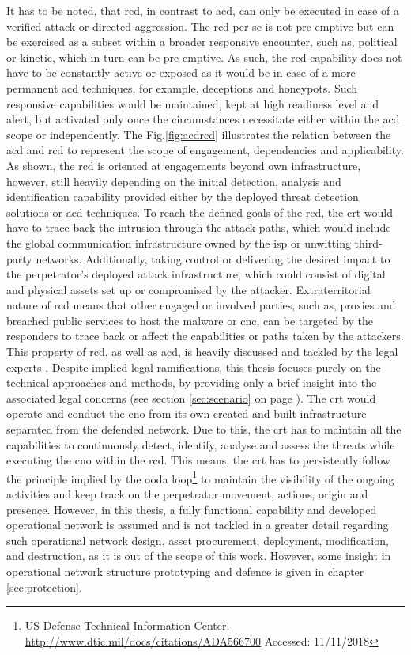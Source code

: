 It has to be noted, that \gls{rcd}, in contrast to \gls{acd}, can only be executed in case of a verified attack or directed aggression. The \gls{rcd} per se is not pre-emptive but can be exercised as a subset within a broader responsive encounter, such as, political or kinetic, which in turn can be pre-emptive.
As such, the \gls{rcd} capability does not have to be constantly active or exposed as it would be in case of a more permanent \gls{acd} techniques, for example, deceptions and honeypots. Such responsive capabilities would be maintained, kept at high readiness level and alert, but activated only once the circumstances necessitate either within the \gls{acd} scope or independently.
The Fig.\ref{fig:acdrcd} illustrates the relation between the \gls{acd} and \gls{rcd} to represent the scope of engagement, dependencies and applicability.
As shown, the \gls{rcd} is oriented at engagements beyond own infrastructure, however, still heavily depending on the initial detection, analysis and identification capability provided either by the deployed threat detection solutions or \gls{acd} techniques. To reach the defined goals of the \gls{rcd}, the \gls{crt} would have to trace back the intrusion through the attack paths, which would include the global communication infrastructure owned by the \gls{isp} or unwitting third-party networks. Additionally, taking control or delivering the desired impact to the perpetrator's deployed attack infrastructure, which could consist of digital and physical assets set up or compromised by the attacker.
Extraterritorial nature of \gls{rcd} means that other engaged or involved parties, such as, proxies and breached public services to host the malware or \gls{cnc}, can be targeted by the responders to trace back or affect the capabilities or paths taken by the attackers. This property of \gls{rcd}, as well as \gls{acd}, is heavily discussed and tackled by the legal experts \cite{Brangetto2014-2}. Despite implied legal ramifications, this thesis focuses purely on the technical approaches and methods, by providing only a brief insight into the associated legal concerns (see section \ref{sec:scenario} on page \pageref{sec:scenario}).
The \gls{crt} would operate and conduct the \gls{cno} from its own created and built infrastructure separated from the defended network. Due to this, the \gls{crt} has to maintain all the capabilities to continuously detect, identify, analyse and assess the threats while executing the \gls{cno} within the \gls{rcd}. This means, the \gls{crt} has to persistently follow the principle implied by the \gls{ooda} loop\footnote{US Defense Technical Information Center. \url{http://www.dtic.mil/docs/citations/ADA566700} Accessed: 11/11/2018} to maintain the visibility of the ongoing activities and keep track on the perpetrator movement, actions, origin and presence. However, in this thesis, a fully functional capability and developed operational network is assumed and is not tackled in a greater detail regarding such operational network design, asset procurement, deployment, modification, and destruction, as it is out of the scope of this work. However, some insight in operational network structure prototyping and defence is given in chapter \ref{sec:protection}.

